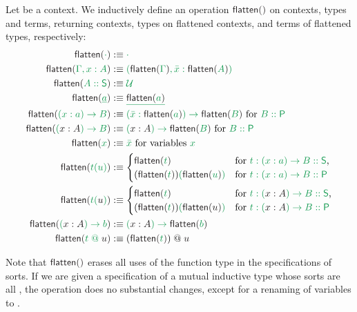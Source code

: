 \begin{defn}[Flattening]
Let \grm{\Gamma} be a context. We inductively define an operation $\flatten{}$ on
contexts, types and terms, returning contexts, types on flattened contexts, and
terms of flattened types, respectively:
\begin{align*}
\flatten{\cdot}			&:\equiv \grm{\cdot} \\
\flatten{\Gamma, x : A}		&:\equiv \grm{(\flatten{\Gamma}, \bar{x} : \flatten{A})} \\ %
\flatten{A :: \Sc}		&:\equiv \grm{\UU} \\
\flatten{\underline{a}}		&:\equiv \grm{\underline{\flatten{\grm{a}}}} \\
\flatten{(x : a) \to B}		&:\equiv \grm{(\bar{x} : \flatten{a}) \to \flatten{B}} \text{ for \grm{B :: \Pc}} \\
\flatten{(\blm{x : A}) \to B}	&:\equiv \grm{(\blm{x : A}) \to \flatten{B}} \text{ for \grm{B :: \Pc}} \\
\flatten{x}				&:\equiv \grm{\bar{x}} \text{ for variables \grm{x}} \\
\flatten{t(u)}			&:\equiv
	\begin{cases}
	\flatten{t} & \text{for \grm{t : (x : a) \to B :: \Sc},} \\
	(\flatten{t})\grm{(\flatten{u})} & \text{for \grm{t : (x : a) \to B :: \Pc}}
	\end{cases} \\
\flatten{t(\blm{u})}		&:\equiv
	\begin{cases}
	\flatten{t} & \text{for \grm{t : (\blm{x : A}) \to B :: \Sc},} \\
	(\flatten{t})\grm{(\flatten{\blm{u}})} & \text{for \grm{t : (\blm{x : A}) \to B :: \Pc}}
	\end{cases} \\
\flatten{(\blm{x : A}) \to b}	&:\equiv \grm{(\blm{x : A}) \to \flatten{b}} \\
\flatten{t \app \blm{u}}	&:\equiv (\flatten{t}) \app \blm{u}
\end{align*}
\end{defn}

Note that $\flatten{}$ erases all uses of the function type in the
specifications of sorts.
If we are given a specification of a mutual inductive type whose sorts are all
\grm{\UU}, the operation does no substantial changes, except for a renaming
of variables  to .

